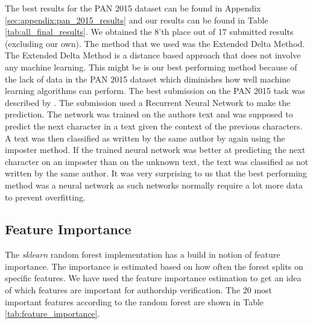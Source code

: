 The best results for the PAN 2015 dataset can be found in Appendix
\ref{sec:appendix:pan_2015_results} and our results can be found in Table
\ref{tab:all_final_results}. We obtained the 8'th place out of 17 submitted
results (excluding our own). The method that we used was the Extended Delta
Method. The Extended Delta Method is a distance based approach that does not
involve any machine learning. This might be is our best performing method
because of the lack of data in the PAN 2015 dataset which diminishes how well
machine learning algorithms can perform. The best submission on the PAN 2015
task was described by \cite{bagnall:2015}. The submission used a Recurrent
Neural Network to make the prediction. The network was trained on the authors
text and was supposed to predict the next character in a text given the context
of the previous characters. A text was then classified as written by the same
author by again using the imposter method. If the trained neural network was
better at predicting the next character on an imposter than on the unknown
text, the text was classified as not written by the same author. It was very
surprising to us that the best performing method was a neural network as such
networks normally require a lot more data to prevent overfitting.

\subsection{Feature Importance}
The \textit{sklearn} random forest implementation has a build in notion of
feature importance. The importance is estimated based on how often the forest
splits on specific features. We have used the feature importance estimation to
get an idea of which features are important for authorship verification. The 20
most important features according to the random forest are shown in Table
\ref{tab:feature_importance}.

